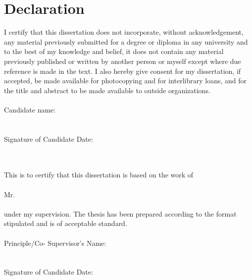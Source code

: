 \chapter*{Declaration}

I certify that this dissertation does not incorporate, without acknowledgement,
any material previously submitted for a degree or diploma in any university and
to the best of my knowledge and belief, it does not contain any material
previously published or written by another person or myself except where due
reference is made in the text.
I also hereby give consent for my dissertation, if accepted, be made available
for photocopying and for interlibrary loans, and for the title and abstract to
be made available to outside organizations.
\\~\\
\noindent Candidate name: \authorname
\\~\\
\noindent\makebox[4cm]{\dotfill}\\
Signature of Candidate \hfill Date: \date: \signaturedate
\\~\\
This is to certify that this dissertation is based on the work of \\~\\
Mr. \authorname \\~\\
under my supervision. The thesis has been prepared according to the format
stipulated and is of acceptable standard.
\\~\\
Principle/Co- Supervisor’s Name: \supervisorname
\\~\\
\noindent\makebox[4cm]{\dotfill}\\
Signature of Candidate \hfill Date: \date: \signaturedate

